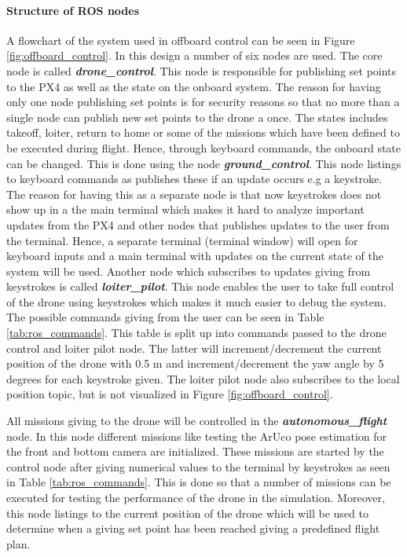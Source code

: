 \documentclass[../Head/report.tex]{subfiles}
\begin{document}
\paragraph{Structure of ROS nodes}

A flowchart of the system used in offboard control can be seen in Figure \ref{fig:offboard_control}. In this design a number of six nodes are used. The core node is called \textit{\textbf{drone\_control}}. This node is responsible for publishing set points to the PX4 as well as the state on the onboard system. The reason for having only one node publishing set points is for security reasons so that no more than a single node can publish new set points to the drone a once. The states includes takeoff, loiter, return to home or some of the missions which have been defined to be executed during flight. Hence, through keyboard commands, the onboard state can be changed. This is done using the node \textit{\textbf{ground\_control}}. This node listings to keyboard commands as publishes these if an update occurs e.g a keystroke. The reason for having this as a separate node is that now keystrokes does not show up in a the main terminal which makes it hard to analyze important updates from the PX4 and other nodes that publishes updates to the user from the terminal. Hence, a separate terminal (terminal window) will open for keyboard inputs and a main terminal with updates on the current state of the system will be used. Another node which subscribes to updates giving from keystrokes is called  \textit{\textbf{loiter\_pilot}}. This node enables the user to take full control of the drone using keystrokes which makes it much easier to debug the system. The possible commands giving from the user can be seen in Table \ref{tab:ros_commands}. This table is split up into commands passed to the drone control and loiter pilot node. The latter will increment/decrement the current position of the drone with 0.5 m and increment/decrement the yaw angle by 5 degrees for each keystroke given. The loiter pilot node also subscribes to the local position topic, but is not visualized in Figure \ref{fig:offboard_control}.

All missions giving to the drone will be controlled in the \textit{\textbf{autonomous\_flight}} node. In this node different missions like testing the ArUco pose estimation for the front and bottom camera are initialized. These missions are started by the control node after giving numerical values to the terminal by keystrokes as seen in Table  \ref{tab:ros_commands}. This is done so that a number of missions can be executed for testing the performance of the drone in the simulation. Moreover, this node listings to the current position of the drone which will be used to determine when a giving set point has been reached giving a predefined flight plan. 
\end{document}
